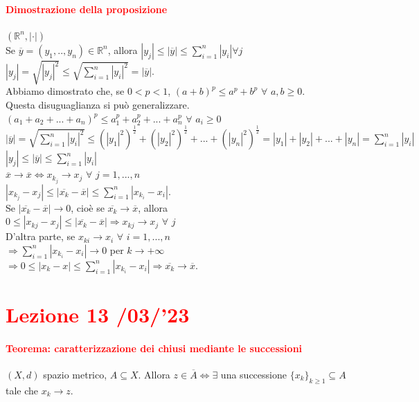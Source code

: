 \documentclass{article}
\newcommand{\R}{\mathbb{R}}
\begin{document}
\paragraph{\textcolor{red}{Dimostrazione della proposizione}}
$(\R^n, |\cdot|)$\\
Se $\overline{y}=(y_1,..,y_n)\in \R^n$, allora $|y_j|\leq |\overline{y}|\leq \sum_{i=1}^{n}|y_i| \forall j$\\
$|y_j| = \sqrt{|y_j|^2} \leq \sqrt{\sum_{i=1}^{n}|y_i|^2} = |\overline{y}|$.\\
Abbiamo dimostrato che, se $0 <p<1$, $(a+b)^p\leq a^p+b^p \,\, \forall\,\, a,b \geq 0$.\\
Questa disuguaglianza si può generalizzare.\\
$(a_1+a_2+...+a_n)^p\leq a_1^p+a_2^p+...+a_n^p \,\, \forall\,\, a_i \geq 0$\\
$|\overline{y}|=\sqrt{\sum_{i=1}^{n}|y_i|^2} \leq (|y_1|^2)^{\frac{1}{2}}+(|y_2|^2)^{\frac{1}{2}}+...+(|y_n|^2)^{\frac{1}{2}}= |y_1|+|y_2|+...+|y_n|= \sum_{i=1}^{n}|y_i|$\\
$|y_j|\leq |\overline{y}| \leq \sum_{i=1}^{n}|y_i|$\\
$\overline{x} \rightarrow \overline{x} \Leftrightarrow x_{k_j} \rightarrow x_j \,\, \forall\,\, j=1,...,n$\\
$|x_{k_j}-x_j|\leq |\overline{x_k}-\overline{x}| \leq \sum_{i=1}^{n}|x_{k_i}-x_i|$.\\
Se $|\overline{x_k} - \overline{x}|\rightarrow 0 $, cioè se $\overline{x_k}\rightarrow \overline{x}$, allora\\
$0 \leq |x_{kj}-x_j|\leq |\overline{x_k}-\overline{x}| \Rightarrow x_{kj} \rightarrow x_j \,\, \forall \,\, j$\\
D'altra parte, se $x_{ki} \rightarrow  x_i \,\, \forall \,\, i=1,...,n $\\
$\Rightarrow \sum_{i=1}^{n}|x_{k_i}- x_i| \rightarrow 0 $ per $k \rightarrow + \infty$\\
$\Rightarrow 0 \leq |x_{k}- x| \leq \sum_{i=1}^{n}|x_{k_i}- x_i| \Rightarrow \overline{x_k} \rightarrow \overline{x}$.
\begin{flushright}
\large\Lightning
\end{flushright}

\newpage
\section{\textcolor{red}{Lezione 13 \space{}/03/'23}}
\paragraph{\textcolor{red}{Teorema: caratterizzazione dei chiusi mediante le successioni}}
$(X,d)$ spazio metrico, $A \subseteq X$. Allora $z\in \overline{A}\Leftrightarrow \exists$ una successione $\{x_k\}_{k\geq 1} \subseteq A $ tale che $x_k \rightarrow z$.
\end{document}
